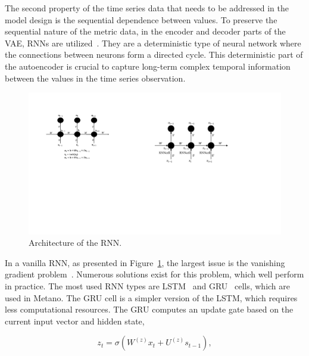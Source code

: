 
The second property of the time series data that needs to be addressed in the model design is the sequential dependence between values. To preserve the sequential nature of the metric data, in the encoder and decoder parts of the VAE, RNNs are utilized~\cite{rumelhart1986learning}. They are a deterministic type of neural network where the connections between neurons form a directed cycle. This deterministic part of the autoencoder is crucial to capture long-term complex temporal information between the values in the time series observation.


\begin{figure}[!t]
\centerline{\includegraphics[scale=1.1]{gfx/chap4/rnn.pdf}}
\caption{Architecture of the RNN.}
\label{figrnn}
\end{figure}

In a vanilla RNN, as presented in Figure~\ref{figrnn}, the largest issue is the vanishing gradient problem~\cite{hochreiter1998vanishing}. Numerous solutions exist for this problem, which well perform in practice. The most used RNN types are LSTM~\cite{hochreiter1997long} and GRU~\cite{cho2014properties} cells, which are used in Metano. The GRU cell is a simpler version of the LSTM, which requires less computational resources. The GRU computes an update gate based on the current input vector and hidden state,

\begin{equation}\label{eq4}
  z_t = \sigma(W^{(z)}x_t + U^{(z)}s_{t-1}),
\end{equation}

